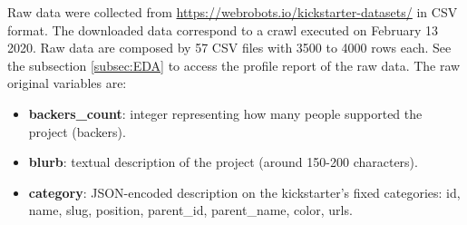 \documentclass{article}
\begin{document}
Raw data were collected from \url{https://webrobots.io/kickstarter-datasets/} in CSV format.  The downloaded data correspond to a crawl executed on February 13 2020. Raw data are composed by 57 CSV files with 3500 to 4000 rows each. See the subsection \ref{subsec:EDA} to access the profile report of the raw data. The raw original variables are:
\begin{itemize}

    \item \textbf{backers\_count}: integer representing how many people supported the project (backers).
    \item \textbf{blurb}: textual description of the project (around 150-200 characters).
    \item \textbf{category}: JSON-encoded description on the kickstarter's fixed categories: id, name, slug, position, parent\_id, parent\_name, color, urls.


\end{itemize}
\end{document}
